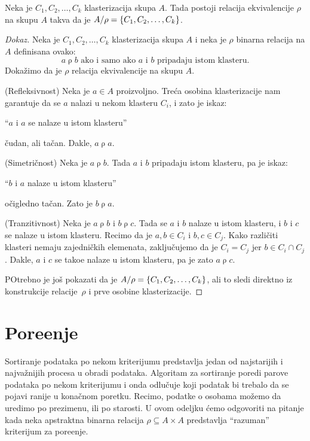 \begin{THM}
  Neka je $C_1, C_2, \ldots, C_k$ klasterizacija skupa $A$. Tada postoji relacija ekvivalencije $\rho$ na skupu $A$
  takva da je $A / \mbox{$\rho$} = \{C_1, C_2, \ldots, C_k\}$.
\end{THM}
\begin{proof}[Dokaz]
  Neka je $C_1, C_2, \ldots, C_k$ klasterizacija skupa $A$ i neka je $\rho$ binarna relacija na $A$ definisana ovako:
  $$
    a \mathrel\rho b \text{\ \ ako i samo ako $a$ i $b$ pripadaju istom klasteru.}
  $$
  Doka\v zimo da je $\rho$ relacija ekvivalencije na skupu $A$.

    (Refleksivnost)
    Neka je $a \in A$ proizvoljno. Tre\'ca osobina klasterizacije nam garantuje da se $a$ nalazi u nekom klasteru $C_i$, i zato je iskaz:
	\begin{center}
	  \enquote{$a$ i $a$ se nalaze u istom klasteru}
	\end{center}
	\v cudan, ali ta\v can. Dakle, $a \mathrel\rho a$.

    (Simetri\v cnost)
    Neka je $a \mathrel\rho b$. Tada $a$ i $b$ pripadaju istom klasteru, pa je iskaz:
	\begin{center}
	  \enquote{$b$ i $a$ nalaze u istom klasteru}
	\end{center}
	o\v cigledno ta\v can. Zato je $b \mathrel\rho a$.

    (Tranzitivnost)
    Neka je $a \mathrel\rho b$ i $b \mathrel\rho c$. Tada se $a$ i $b$ nalaze u istom klasteru, i $b$ i $c$ se nalaze u istom klasteru.
    Recimo da je $a, b \in C_i$ i $b, c \in C_j$. Kako razli\v citi klasteri nemaju zajedni\v ckih elemenata, zaklju\v cujemo
    da je $C_i = C_j$ jer $b \in C_i \cap C_j$. Dakle, $a$ i $c$ se tako\dj e nalaze u istom klasteru, pa je zato
    $a \mathrel\rho c$.

    POtrebno je jo\v s pokazati da je $A / \mbox{$\rho$} = \{C_1, C_2, \ldots, C_k\}$, ali to sledi direktno iz konstrukcije relacije~$\rho$
	i prve osobine klasterizacije.
\end{proof}

\section{Pore\dj enje}

Sortiranje podataka po nekom kriterijumu predstavlja jedan od najstarijih i najva\v znijih procesa u obradi podataka.
Algoritam za sortiranje poredi parove podataka po nekom kriterijumu i onda odlu\v cuje koji podatak bi trebalo da se pojavi
ranije u kona\v cnom poretku.
Recimo, podatke o osobama mo\v zemo da uredimo po prezimenu, ili po starosti.
U ovom odeljku \'cemo odgovoriti na pitanje kada neka apstraktna binarna relacija $\rho \subseteq A \times A$ predstavlja
\enquote{razuman} kriterijum za pore\dj enje.


